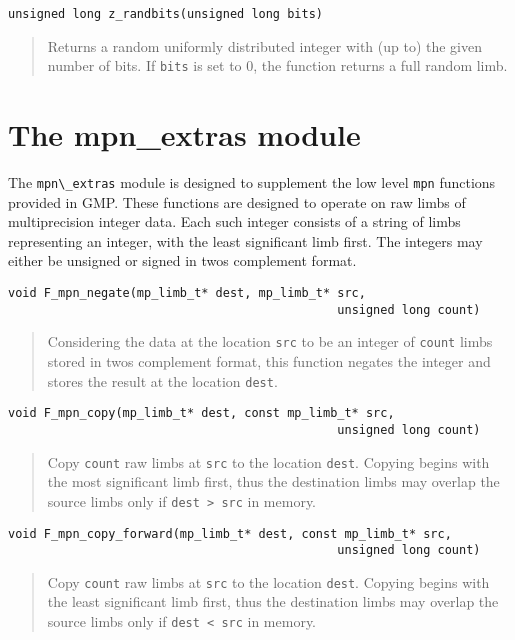 \documentclass[a4paper,10pt]{article}
\newcommand{\code}{\lstinline}
\begin{document}
\begin{lstlisting}
unsigned long z_randbits(unsigned long bits)
\end{lstlisting}
\begin{quote}
Returns a random uniformly distributed integer with (up to) the given number of bits. If \code{bits} is set to 0, the function returns a full random limb.
\end{quote}

\section{The mpn\_extras module}

The \code{mpn\_extras} module is designed to supplement the low level \code{mpn} functions provided in GMP. These functions are designed to operate on raw limbs of multiprecision integer data. Each such integer consists of a string of limbs representing an integer, with the least significant limb first. The integers may either be unsigned or signed in twos complement format.

\begin{lstlisting}
void F_mpn_negate(mp_limb_t* dest, mp_limb_t* src, 
                                              unsigned long count)
\end{lstlisting}
\begin{quote}
Considering the data at the location \code{src} to be an integer of \code{count} limbs stored in twos complement format, this function negates the integer and stores the result at the location \code{dest}.
\end{quote}

\begin{lstlisting}
void F_mpn_copy(mp_limb_t* dest, const mp_limb_t* src, 
                                              unsigned long count)
\end{lstlisting}
\begin{quote}
Copy \code{count} raw limbs at \code{src} to the location \code{dest}. Copying begins with the most significant limb first, thus the destination limbs may overlap the source limbs only if \code{dest > src} in memory.
\end{quote}

\begin{lstlisting}
void F_mpn_copy_forward(mp_limb_t* dest, const mp_limb_t* src,  
                                              unsigned long count)
\end{lstlisting}
\begin{quote}
Copy \code{count} raw limbs at \code{src} to the location \code{dest}. Copying begins with the least significant limb first, thus the destination limbs may overlap the source limbs only if \code{dest < src} in memory.
\end{quote}
\end{document}
